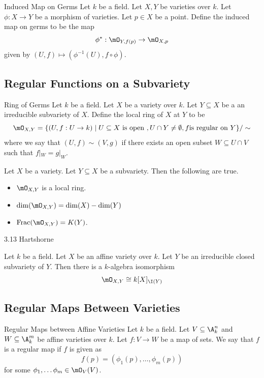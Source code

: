 \documentclass[a4paper]{article}
\begin{document}
\begin{defn}{Induced Map on Germs}{} Let $k$ be a field. Let $X,Y$ be varieties over $k$. Let $\phi:X\to Y$ be a morphism of varieties. Let $p\in X$ be a point. Define the induced map on germs to be the map $$\phi^\ast:\mO_{Y,f(p)}\to\mO_{X,p}$$ given by $(U,f)\mapsto(\phi^{-1}(U),f\circ\phi)$. 
\end{defn}

\subsection{Regular Functions on a Subvariety}
\begin{defn}{Ring of Germs}{} Let $k$ be a field. Let $X$ be a variety over $k$. Let $Y\subseteq X$ be a an irreducible subvariety of $X$. Define the local ring of $X$ at $Y$ to be $$\mO_{X,Y}=\{(U,f:U\to k)\;|\;U\subseteq X\text{ is open }, U\cap Y\neq\emptyset, f\text{is regular on }Y\}/\sim$$ where we say that $(U,f)\sim(V,g)$ if there exists an open subset $W\subseteq U\cap V$ such that $f|_W=g|_W$. 
\end{defn}

\begin{prp}{}{} Let $X$ be a variety. Let $Y\subseteq X$ be a subvariety. Then the following are true. 
\begin{itemize}
\item $\mO_{X,Y}$ is a local ring. 
\item $\dim(\mO_{X,Y})=\dim(X)-\dim(Y)$
\item $\text{Frac}(\mO_{X,Y})=K(Y)$. 
\end{itemize}
\end{prp}

3.13 Hartshorne

\begin{prp}{}{} Let $k$ be a field. Let $X$ be an affine variety over $k$. Let $Y$ be an irreducible closed subvariety of $Y$. Then there is a $k$-algebra isomorphism $$\mO_{X,Y}\cong k[X]_{\I(Y)}$$
\end{prp}

\subsection{Regular Maps Between Varieties}
\begin{defn}{Regular Maps between Affine Varieties}{} Let $k$ be a field. Let $V\subseteq\A_k^n$ and $W\subseteq\A_k^m$ be affine varieties over $k$. Let $f:V\to W$ be a map of sets. We say that $f$ is a regular map if $f$ is given as $$f(p)=(\phi_1(p),\dots,\phi_m(p))$$ for some $\phi_1,\dots\phi_m\in\mO_V(V)$. 
\end{defn}
\end{document}
